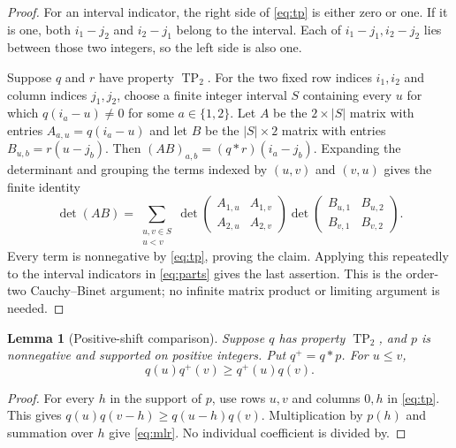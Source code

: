 \documentclass[11pt]{article}
\newtheorem{lemma}[theorem]{Lemma}
\theoremstyle{definition}
\theoremstyle{remark}
\newcommand{\TP}{\operatorname{TP}_2}
\begin{document}
\begin{proof}
For an interval indicator, the right side of \eqref{eq:tp} is either zero
or one. If it is one, both $i_1-j_2$ and $i_2-j_1$ belong to the interval.
Each of $i_1-j_1,i_2-j_2$ lies between those two integers, so the left side
is also one.

Suppose $q$ and $r$ have property $\TP$. For the two fixed row indices
$i_1,i_2$ and column indices $j_1,j_2$, choose a finite integer interval
$S$ containing every $u$ for which $q(i_a-u)\neq0$ for some $a\in\{1,2\}$.
Let $A$ be the $2\times |S|$ matrix with entries $A_{a,u}=q(i_a-u)$ and
let $B$ be the $|S|\times2$ matrix with entries $B_{u,b}=r(u-j_b)$.
Then $(AB)_{a,b}=(q*r)(i_a-j_b)$. Expanding the determinant and grouping
the terms indexed by $(u,v)$ and $(v,u)$ gives the finite identity
\begin{equation}\label{eq:cb}
 \det(AB)=\sum_{\substack{u,v\in S\\u<v}}
 \det\begin{pmatrix}A_{1,u}&A_{1,v}\\A_{2,u}&A_{2,v}\end{pmatrix}
 \det\begin{pmatrix}B_{u,1}&B_{u,2}\\B_{v,1}&B_{v,2}\end{pmatrix}.
\end{equation}
Every term is nonnegative by \eqref{eq:tp}, proving the claim. Applying
this repeatedly to the interval indicators in \eqref{eq:parts} gives the
last assertion. This is the order-two Cauchy--Binet argument; no infinite
matrix product or limiting argument is needed.
\end{proof}

\begin{lemma}[Positive-shift comparison]\label{lem:shift}
Suppose $q$ has property $\TP$, and $p$ is nonnegative and supported on
positive integers. Put $q^+=q*p$. For $u\leq v$,
\begin{equation}\label{eq:mlr}
 q(u)q^+(v)\geq q^+(u)q(v).
\end{equation}
\end{lemma}

\begin{proof}
For every $h$ in the support of $p$, use rows $u,v$ and columns $0,h$ in
\eqref{eq:tp}. This gives
$q(u)q(v-h)\geq q(u-h)q(v)$. Multiplication by $p(h)$ and summation over
$h$ give \eqref{eq:mlr}. No individual coefficient is divided by.
\end{proof}
\end{document}
